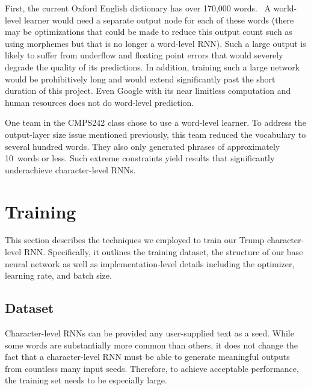 \documentclass{article}
\begin{document}
First, the current Oxford English dictionary has over 170,000 words.~\cite{oxfordWordCount} A world-level learner would need a separate output node for each of these words (there may be optimizations that could be made to reduce this output count such as using morphemes but that is no longer a word-level RNN).  Such a large output is likely to suffer from underflow and floating point errors that would severely degrade the quality of its predictions.  In addition, training such a large network would be prohibitively long and would extend significantly past the short duration of this project.  Even Google with its near limitless computation and human resources does not do word-level prediction.

One team in the CMPS242 class chose to use a word-level learner.  To address the output-layer size issue mentioned previously, this team reduced the vocabulary to several hundred words.  They also only generated phrases of approximately 10~words or less.  Such extreme constraints yield results that significantly underachieve character-level RNNs.

\section{Training}\label{sec:training}

This section describes the techniques we employed to train our Trump character-level RNN.  Specifically, it outlines the training dataset, the structure of our base neural network as well as implementation-level details including the optimizer, learning rate, and batch size.

\subsection{Dataset}

Character-level RNNs can be provided any user-supplied text as a seed.  While some words are substantially more common than others, it does not change the fact that a character-level RNN must be able to generate meaningful outputs from countless many input seeds. Therefore, to achieve acceptable performance, the training set needs to be especially large.
\end{document}

